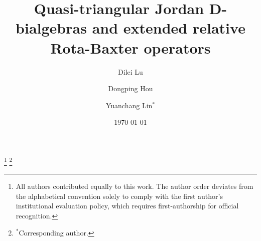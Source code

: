 \documentclass[12pt, reqno, a4paper]{amsart}
\theoremstyle{definition}
\begin{document}
\title{Quasi-triangular Jordan D-bialgebras and extended relative Rota-Baxter operators}


\author[D.~Lu]{Dilei Lu}
\address{College of Applied Science, Beijing Information Science and Technology University, Beijing 100192, China}


\author[D.~P.~Hou]{Dongping Hou}
\address{School of Mathematics, Yunnan Normal University, Kunming 650500, China}

\author[Y.~Lin]{Yuanchang Lin$^{\ast}$}
\address{School of Mathematics, North University of China, Taiyuan 030051, China}

\thanks{All authors contributed equally to this work. The author order deviates from the alphabetical convention solely to comply with the first author's institutional evaluation policy, which requires first-authorship for official recognition.}
\thanks{$^\ast$Corresponding author.}



\date{\today}
\end{document}
